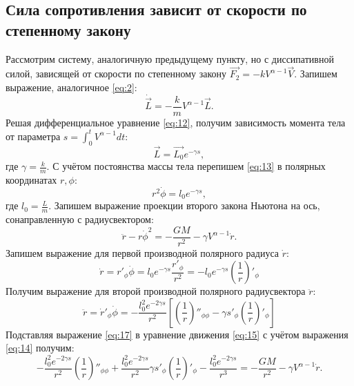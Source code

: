 \documentclass[12pt]{article}
\begin{document}
\subsection{Сила сопротивления зависит от скорости по степенному закону}
Рассмотрим систему, аналогичную предыдущему пункту, но с диссипативной силой, зависящей от скорости по степенному закону 
$\vec{F_2} = -kV^{\alpha - 1}\vec{V}$. Запишем выражение, аналогичное \ref{eq:2}:
\begin{equation}\label{eq:12}
    \dot{\vec{L}} = -\frac{k}{m}V^{\alpha - 1}\vec{L}.
\end{equation}
Решая дифференциальное уравнение \ref{eq:12}, получим зависимость момента тела от параметра $s = \int_0^t V^{\alpha - 1}dt$:
\begin{equation}\label{eq:13}
    \vec{L} = \vec{L_0}e^{-\gamma s},
\end{equation}
где $\gamma = \frac{k}{m}$. С учётом постоянства массы тела перепишем \ref{eq:13} в полярных координатах $r, \phi$:
\begin{equation}\label{eq:14}
    r^2\dot{\phi} = l_0e^{-\gamma s},
\end{equation}
где $l_0 = \frac{L}{m}$. Запишем выражение проекции второго закона Ньютона на ось, сонаправленную с радиусвектором:
\begin{equation}\label{eq:15}
    \ddot{r} - r\dot{\phi}^2 = -\frac{GM}{r^2} - \gamma V^{\alpha - 1}\dot{r}.
\end{equation}
Запишем выражение для первой производной полярного радиуса $\dot{r}$:
\begin{equation}\label{eq:16}
    \dot{r} = r'_\phi \dot{\phi} = l_0e^{-\gamma s}\frac{r'_\phi}{r^2} = -l_0e^{-\gamma s}\left(\frac{1}{r}\right)'_\phi
\end{equation}
Получим выражение для второй производной полярного радиусвектора $\ddot{r}$:
\begin{equation}\label{eq:17}
    \ddot{r} = \dot{r}'_\phi \dot{\phi} = -\frac{l_0^2e^{-2\gamma s}}{r^2}\left[\left(\frac{1}{r}\right)''_{\phi\phi} - \gamma s'_\phi \left(\frac{1}{r}\right)'_\phi\right]
\end{equation}
Подставляя выражение \ref{eq:17} в уравнение движения \ref{eq:15} с учётом выражения \ref{eq:14} получим:
\begin{equation}\label{eq:18}
    -\frac{l_0^2e^{-2\gamma s}}{r^2}\left(\frac{1}{r}\right)''_{\phi\phi} + 
    \frac{l_0^2e^{-2\gamma s}}{r^2}\gamma s'_\phi \left(\frac{1}{r}\right)'_\phi - 
    \frac{l_0^2e^{-2\gamma s}}{r^3} = -\frac{GM}{r^2} - \gamma V^{\alpha - 1}\dot{r}.
\end{equation}
\end{document}
